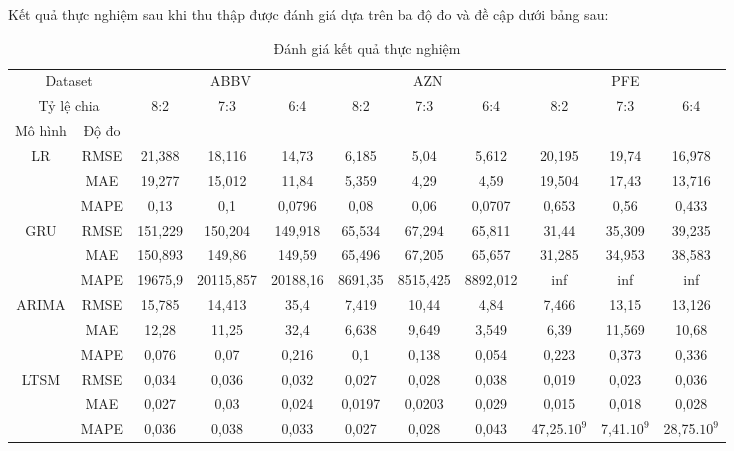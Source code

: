 \documentclass[conference]{IEEEtran}
\begin{document}
Kết quả thực nghiệm sau khi thu thập được đánh giá dựa trên ba độ đo và đề cập dưới bảng sau:
\begin{table}[H]
    \centering
    \caption{Đánh giá kết quả thực nghiệm}
    \renewcommand{\arraystretch}{2}
    \tiny
    \begin{adjustbox}{width=0.5\textwidth}
    \begin{tabular}{|c|c|c|c|c|c|c|c|c|c|c|} \hline
          \multicolumn{2}{|c|}{Dataset} & \multicolumn{3}{c|}{ABBV} & \multicolumn{3}{c|}{AZN} & \multicolumn{3}{c|}{PFE} \\ \cline{1-11}
          \multicolumn{2}{|c|}{Tỷ lệ chia} & 8:2 & 7:3 & 6:4 & 8:2 & 7:3 & 6:4 & 8:2 & 7:3 & 6:4 \\ \hline
         Mô hình & Độ đo & & & & & & & & & \\ \hline
         \multirow{3}{*}{LR} & RMSE & 21,388 & 18,116 & 14,73 & 6,185 & 5,04 & 5,612 & 20,195 & 19,74 & 16,978 \\ \cline{2-11}
         & MAE & 19,277 & 15,012 & 11,84 & 5,359 & 4,29 & 4,59 & 19,504 & 17,43 & 13,716 \\ \cline{2-11}
         & MAPE & 0,13 & 0,1 & 0,0796 & 0,08 & 0,06 & 0,0707 & 0,653 & 0,56 & 0,433 \\ \cline{2-11} \hline
         \multirow{3}{*}{GRU} & RMSE & 151,229 & 150,204 & 149,918 & 65,534 & 67,294 & 65,811 & 31,44 & 35,309 & 39,235 \\ \cline{2-11}
         & MAE & 150,893 & 149,86 & 149,59 & 65,496 & 67,205 & 65,657 & 31,285 & 34,953 & 38,583 \\ \cline{2-11}
         & MAPE & 19675,9 & 20115,857 & 20188,16 & 8691,35 & 8515,425 & 8892,012 & inf & inf & inf \\ \cline{2-11} \hline
         \multirow{3}{*}{ARIMA} & RMSE & 15,785 & 14,413 & 35,4 & 7,419 & 10,44 & 4,84 & 7,466 & 13,15 & 13,126 \\ \cline{2-11}
         & MAE & 12,28 & 11,25 & 32,4 & 6,638 & 9,649 & 3,549 & 6,39 & 11,569 & 10,68 \\ \cline{2-11}
         & MAPE & 0,076 & 0,07 & 0,216 & 0,1 & 0,138 & 0,054 & 0,223 & 0,373 & 0,336 \\ \cline{2-11} \hline
         \multirow{3}{*}{LTSM} & RMSE & 0,034 & 0,036 & 0,032 & 0,027 & 0,028 & 0,038 & 0,019 & 0,023 & 0,036 \\ \cline{2-11}
         & MAE & 0,027 & 0,03 & 0,024 & 0,0197 & 0,0203 & 0,029 & 0,015 & 0,018 & 0,028 \\ \cline{2-11}
         & MAPE & 0,036 & 0,038 & 0,033 & 0,027 & 0,028 & 0,043 & 47,25.$10^9$ & 7,41.$10^9$ & 28,75.$10^9$ \\ \cline{2-11} \hline

\end{tabular}
\end{adjustbox}
\end{table}
\end{document}
